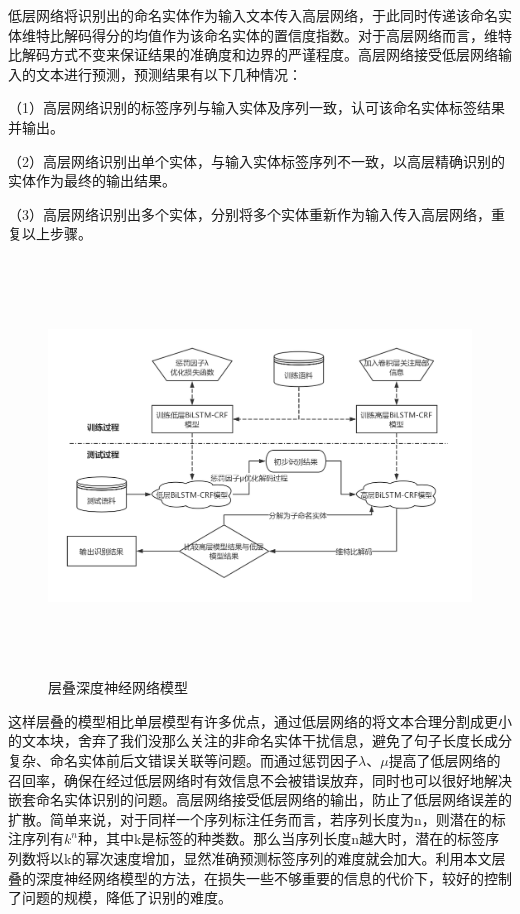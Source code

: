 \documentclass[winfonts,master,oneside,nobackinfo]{njuthesis}
\begin{document}
低层网络将识别出的命名实体作为输入文本传入高层网络，于此同时传递该命名实体维特比解码得分的均值作为该命名实体的置信度指数。对于高层网络而言，维特比解码方式不变来保证结果的准确度和边界的严谨程度。高层网络接受低层网络输入的文本进行预测，预测结果有以下几种情况：

（1）高层网络识别的标签序列与输入实体及序列一致，认可该命名实体标签结果并输出。

（2）高层网络识别出单个实体，与输入实体标签序列不一致，以高层精确识别的实体作为最终的输出结果。

（3）高层网络识别出多个实体，分别将多个实体重新作为输入传入高层网络，重复以上步骤。



\begin{figure}[H]
\centering
\begin{minipage}[t]{\textwidth}
\includegraphics[width=1.1\textwidth,height=11cm]{./figure/层叠模型流程.jpg}
\caption{层叠深度神经网络模型}
\label{lab:1}
\end{minipage}
\end{figure}

这样层叠的模型相比单层模型有许多优点，通过低层网络的将文本合理分割成更小的文本块，舍弃了我们没那么关注的非命名实体干扰信息，避免了句子长度长成分复杂、命名实体前后文错误关联等问题。而通过惩罚因子$\lambda$、$\mu$提高了低层网络的召回率，确保在经过低层网络时有效信息不会被错误放弃，同时也可以很好地解决嵌套命名实体识别的问题。高层网络接受低层网络的输出，防止了低层网络误差的扩散。简单来说，对于同样一个序列标注任务而言，若序列长度为n，则潜在的标注序列有$k^n$种，其中k是标签的种类数。那么当序列长度n越大时，潜在的标签序列数将以k的幂次速度增加，显然准确预测标签序列的难度就会加大。利用本文层叠的深度神经网络模型的方法，在损失一些不够重要的信息的代价下，较好的控制了问题的规模，降低了识别的难度。
\end{document}
